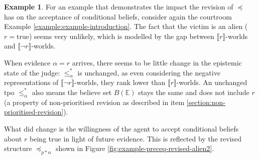 \documentclass[english, 12pt]{scrartcl}
\theoremstyle{definition}
\newtheorem{example}{Example}
\theoremstyle{definition}
\theoremstyle{definition}
\newcommand{\modelsOf}[1]{\llbracket #1 \rrbracket}
\begin{document}
\begin{example}
    \label{example:example-preceq-revised-alien}
    For an example that demonstrates the impact the revision of $\preceq$ has on the acceptance of conditional beliefs, consider again the courtroom Example \ref{example:example-introduction}. The fact that the victim is an alien ($r=\textrm{true}$) seems very unlikely, which is modelled by the gap between $\modelsOf{r}$-worlds and $\modelsOf{\neg r}$-worlds.
    
    When evidence $\alpha = r$ arrives, there seems to be little change in the epistemic state of the judge: $\leq_{\alpha}^{\ast}$ is unchanged, as even considering the negative representations of $\modelsOf{\neg r}$-worlds, they rank lower than $\modelsOf{r}$-worlds. An unchanged tpo $\leq_{\alpha}^{\ast}$ also means the believe set $B(\mathbb{E})$ stays the same and does not include $r$ (a property of non-prioritised revision as described in item \ref{section:non-prioritised-revision}).
    
    What did change is the willingness of the agent to accept conditional beliefs about $r$ being true in light of future evidence. This is reflected by the revised structure $\preceq_{p \ast \alpha}$ shown in Figure \ref{fig:example-preceq-revised-alien2}.

    \begin{figure}[H]
            \centering
\end{figure}
\end{example}
\end{document}

